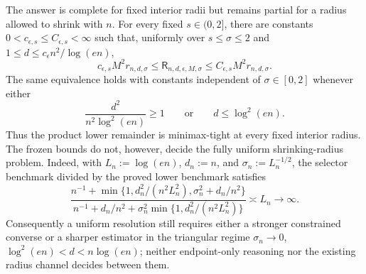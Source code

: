 The answer is complete for fixed interior radii but remains partial for a radius allowed to shrink with \(n\).  For every fixed \(s\in(0,2]\), there are constants \(0<c_{\epsilon,s}\le C_{\epsilon,s}<\infty\) such that, uniformly over \(s\le\sigma\le2\) and \(1\le d\le c_{\epsilon}n^2/\log(en)\),
\[
 c_{\epsilon,s}M^2r_{n,d,\sigma}
 \le \mathsf R_{n,d,\epsilon,M,\sigma}
 \le C_{\epsilon,s}M^2r_{n,d,\sigma}.
\]
The same equivalence holds with constants independent of \(\sigma\in[0,2]\) whenever either
\[
 \frac{d^2}{n^2\log^2(en)}\ge1
 \qquad\text{or}\qquad
 d\le\log^2(en).
\]
Thus the product lower remainder is minimax-tight at every fixed interior radius.  The frozen bounds do not, however, decide the fully uniform shrinking-radius problem.  Indeed, with \(L_n:=\log(en)\), \(d_n:=n\), and \(\sigma_n:=L_n^{-1/2}\), the selector benchmark divided by the proved lower benchmark satisfies
\[
 \frac{n^{-1}+\min\{1,d_n^2/(n^2L_n^2),\sigma_n^2+d_n/n^2\}}
 {n^{-1}+d_n/n^2+\sigma_n^2\min\{1,d_n^2/(n^2L_n^2)\}}
 \asymp L_n\longrightarrow\infty.
\]
Consequently a uniform resolution still requires either a stronger constrained converse or a sharper estimator in the triangular regime \(\sigma_n\to0\), \(\log^2(en)<d<n\log(en)\); neither endpoint-only reasoning nor the existing radius channel decides between them.